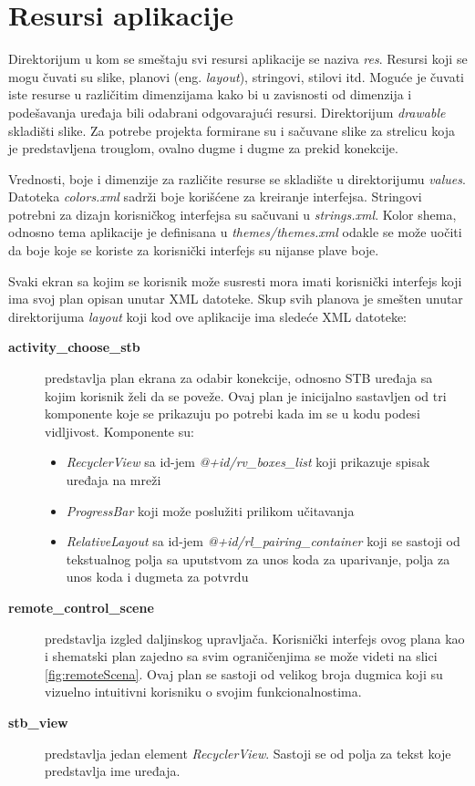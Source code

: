 \documentclass[implementacija.tex]{subfiles}
\begin{document}



\section{Resursi aplikacije}
Direktorijum u kom se smeštaju svi resursi aplikacije se naziva \textit{res}. Resursi koji se mogu čuvati su slike, planovi (eng. \textit{layout}), stringovi, stilovi itd. Moguće je čuvati iste resurse u različitim dimenzijama kako bi u zavisnosti od dimenzija i podešavanja uređaja bili odabrani odgovarajući resursi. Direktorijum \textit{drawable} skladišti slike. Za potrebe projekta formirane su i sačuvane slike za strelicu koja je predstavljena trouglom, ovalno dugme i dugme za prekid konekcije. 

Vrednosti, boje i dimenzije za različite resurse se skladište u direktorijumu \textit{values}. Datoteka \textit{colors.xml} sadrži boje korišćene za kreiranje interfejsa. Stringovi potrebni za dizajn korisničkog interfejsa su sačuvani u \textit{strings.xml}. Kolor shema, odnosno tema aplikacije je definisana u \textit{themes/themes.xml} odakle se može uočiti da boje koje se koriste za korisnički interfejs su nijanse plave boje. 

Svaki ekran sa kojim se korisnik može susresti mora imati korisnički interfejs koji ima svoj plan opisan unutar XML datoteke. Skup svih planova je smešten unutar direktorijuma \textit{layout} koji kod ove aplikacije ima sledeće XML datoteke:
\begin{description}
\item[\textbf{activity\_choose\_stb}] predstavlja plan ekrana za odabir konekcije, odnosno STB uređaja sa kojim korisnik želi da se poveže. Ovaj plan je inicijalno sastavljen od tri komponente koje se prikazuju po potrebi kada im se u kodu podesi vidljivost. Komponente su:
\begin{itemize}
    \item \textit{RecyclerView} sa id-jem \textit{@+id/rv\_boxes\_list} koji prikazuje spisak uređaja na mreži
    \item \textit{ProgressBar} koji može poslužiti prilikom učitavanja
    \item \textit{RelativeLayout} sa id-jem \textit{@+id/rl\_pairing\_container} koji se sastoji od tekstualnog polja sa uputstvom za unos koda za uparivanje, polja za unos koda i dugmeta za potvrdu 
\end{itemize}
\item[\textbf{remote\_control\_scene}] predstavlja izgled daljinskog upravljača. Korisnički interfejs ovog plana kao i shematski plan zajedno sa svim ograničenjima se može videti na slici \ref{fig:remoteScena}. Ovaj plan se sastoji od velikog broja dugmica koji su vizuelno intuitivni korisniku o svojim funkcionalnostima.
\item[\textbf{stb\_view}] predstavlja jedan element \textit{RecyclerView}. Sastoji se od polja za tekst koje predstavlja ime uređaja. 
\end{description}
\end{document}
